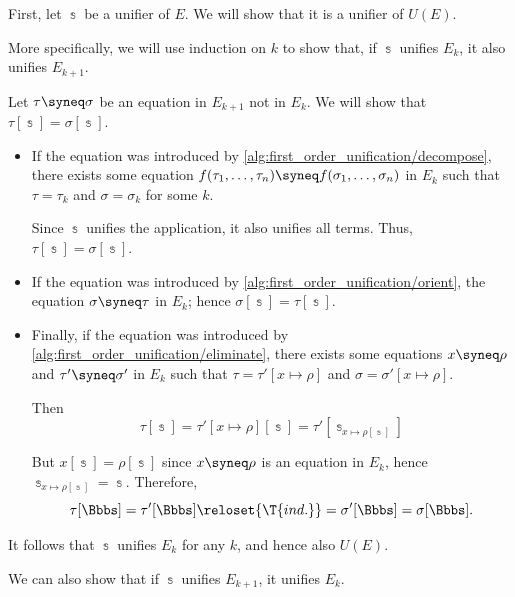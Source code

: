 \begin{defproof}
   First, let \( \Bbbs \) be a unifier of \( E \). We will show that it is a unifier of \( U(E) \).

  More specifically, we will use induction on \( k \) to show that, if \( \Bbbs \) unifies \( E_k \), it also unifies \( E_{k+1} \).

  Let \( \tau \syneq \sigma \) be an equation in \( E_{k+1} \) not in \( E_k \). We will show that \( \tau[\Bbbs] = \sigma[\Bbbs] \).
  \begin{itemize}
    \item If the equation was introduced by \cref{alg:first_order_unification/decompose}, there exists some equation \( f(\tau_1, \ldots, \tau_n) \syneq f(\sigma_1, \ldots, \sigma_n) \) in \( E_k \) such that \( \tau = \tau_k \) and \( \sigma = \sigma_k \) for some \( k \).

    Since \( \Bbbs \) unifies the application, it also unifies all terms. Thus, \( \tau[\Bbbs] = \sigma[\Bbbs] \).

    \item If the equation was introduced by \cref{alg:first_order_unification/orient}, the equation \( \sigma \syneq \tau \) in \( E_k \); hence \( \sigma[\Bbbs] = \tau[\Bbbs] \).

    \item Finally, if the equation was introduced by \cref{alg:first_order_unification/eliminate}, there exists some equations \( x \syneq \rho \) and \( \tau' \syneq \sigma' \) in \( E_k \) such that \( \tau = \tau'[x \mapsto \rho] \) and \( \sigma = \sigma'[x \mapsto \rho] \).

    Then
    \begin{equation*}
      \tau[\Bbbs] = \tau'[x \mapsto \rho][\Bbbs] = \tau'[\Bbbs_{x \mapsto \rho[\Bbbs]}]
    \end{equation*}

    But \( x[\Bbbs] = \rho[\Bbbs] \) since \( x \syneq \rho \) is an equation in \( E_k \), hence \( \Bbbs_{x \mapsto \rho[\Bbbs]} = \Bbbs \). Therefore,
    \begin{equation*}
      \tau[\Bbbs]
      =
      \tau'[\Bbbs]
      \reloset {\T{ind.}} =
      \sigma'[\Bbbs]
      =
      \sigma[\Bbbs].
    \end{equation*}
  \end{itemize}

  It follows that \( \Bbbs \) unifies \( E_k \) for any \( k \), and hence also \( U(E) \).

   We can also show that if \( \Bbbs \) unifies \( E_{k+1} \), it unifies \( E_k \).


\end{defproof}
